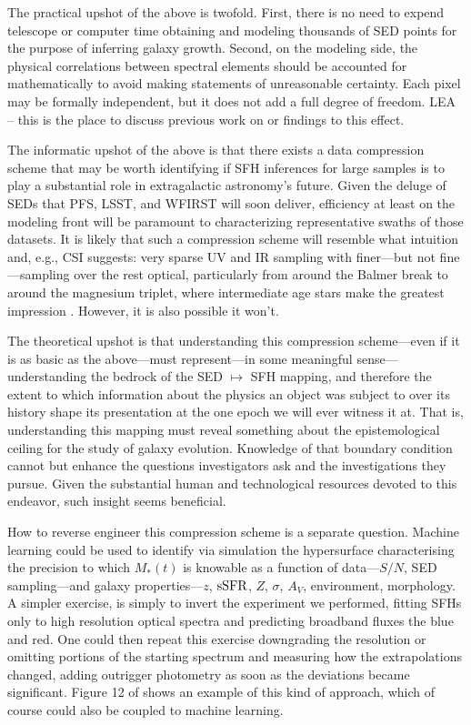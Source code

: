 \documentclass[a4paper,fleqn,usenatbib]{mnras}
\newcommand{\Mstel}{M_\ast}
\newcommand{\bfb}{\color{myblue}}
\newcommand{\ssfr}{{\rm sSFR}}
\begin{document}
The practical upshot of the above is twofold. First, there is no need to expend telescope
or computer time obtaining and modeling thousands of SED points for the purpose of inferring 
galaxy growth. Second, on the modeling side, the physical correlations between spectral
elements should be accounted for mathematically to avoid making statements of unreasonable 
certainty. Each pixel may be formally independent, but it does not add a full degree of freedom.
{\bfb LEA -- this is the place to discuss previous work on or findings to this effect.}

The informatic upshot of the above is that there exists a data compression scheme that may be
worth identifying if SFH inferences for large samples is to play a substantial role in extragalactic 
astronomy's future. Given the deluge of SEDs that PFS, LSST, and WFIRST will soon deliver, 
efficiency at least on the modeling front will be paramount to characterizing representative
swaths of those datasets. It is likely that such a compression scheme will resemble what intuition
and, e.g., CSI suggests: very sparse UV and IR sampling with finer---but not fine---sampling over
the rest optical, particularly from around the Balmer break to around the magnesium triplet,
where intermediate age stars make the greatest impression \citep[e.g.,][]{Dressler16}. However,
it is also possible it won't.

The theoretical upshot is that understanding this compression scheme---even if it is as basic 
as the above---must represent---in some meaningful sense---understanding the bedrock of
the SED $\mapsto$ SFH mapping, and therefore the extent to which information about the
physics an object was subject to over its history shape its presentation at the one epoch we 
will ever witness it at. That is, understanding this mapping must reveal something about the
epistemological ceiling for the study of galaxy evolution. Knowledge of that boundary condition 
cannot but enhance the questions investigators ask and the investigations they pursue. Given 
the substantial human and technological resources devoted to this endeavor, such insight
seems beneficial.

How to reverse engineer this compression scheme is a separate question. Machine learning 
could be used to identify via simulation the hypersurface characterising the precision to which 
$\Mstel(t)$ is knowable as a function of data---$S/N$, SED sampling---and galaxy 
properties---$z$, $\ssfr$, $Z$, $\sigma$, $A_{V}$, environment, morphology. A simpler exercise,
is simply to invert the experiment we performed, fitting SFHs only to high resolution optical 
spectra and predicting broadband fluxes the blue and red. One could then repeat this exercise 
downgrading the resolution or omitting portions of the starting spectrum and measuring how 
the extrapolations changed, adding outrigger photometry as soon as the deviations became
significant. Figure 12 of \citet{Abramson20} shows an example of this kind of approach, 
which of course could also be coupled to machine learning.
\end{document}
